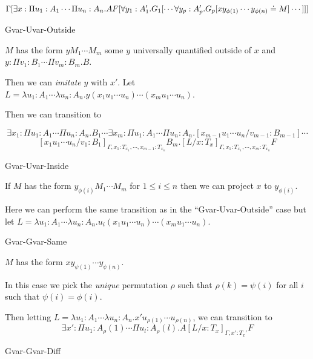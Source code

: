 \[
\Gamma[
\exists x : \Pi u_1 : A_1 \cdots \Pi u_n : A_n . A 
\\
F[\forall y_1 : A'_1 . G_1 
[ \cdots \forall y_p : A'_p . G_p 
[ x y_{\phi(1)} \cdots y_{\phi(n)} \doteq M ]
\cdots
]]]
\]

\begin{tcase}
Gvar-Uvar-Outside
\end{tcase}

$M$ has the form 
$y M_1 \cdots M_m$ some $y$ universally
quantified outside of $x$
and 
$y : \Pi v_1 : B_1 \cdots \Pi v_m : B_m . B$.  

Then we can \textit{imitate} $y$ with $x'$.
Let 
$L = \lambda u_1 : A_1 \cdots \lambda u_n : A_n .
 y (x_1 u_1 \cdots u_n) \cdots (x_m u_1 \cdots u_n)$.

Then we can transition to 

\[
\exists x_1 : \Pi u_1 : A_1 \cdots \Pi u_n : A_n . B_1 \cdots 
\exists x_m : \Pi u_1 : A_1 \cdots \Pi u_n : A_n . 
[x_{m-1}u_1\cdots u_n / v_{m-1} : B_{m-1}]
\cdots 
\]
\[
[x_1 u_1 \cdots u_n / v_1 : B_1]_{\Gamma, x_1:T_{x_1},\cdots, x_{m-1}:T_{x_n}} B_m .
[L / x : T_x ]_{\Gamma, x_1:T_{x_1},\cdots, x_m:T_{x_n}}F
\]

\begin{tcase}
Gvar-Uvar-Inside
\end{tcase}

If $M$ has the form 
$y_{\phi(i)} M_1 \cdots M_m$ for 
$1 \leq i \leq n$ then we can project $x$ to $y_{\phi(i)}$.

Here we can perform the same transition as in the ``Gvar-Uvar-Outside''
case but let 
$L = \lambda u_1 : A_1 \cdots \lambda u_n : A_n .
 u_i (x_1 u_1 \cdots u_n) \cdots (x_m u_1 \cdots u_n)$.

\begin{tcase}
Gvar-Gvar-Same
\end{tcase}

$M$ has the form 
$x y_{\psi(1)} \cdots y_{\psi(n)}$.

In this case we pick the \textit{unique} permutation $\rho$ 
such that $\rho(k) = \psi(i)$ for all $i$ such that $\psi(i) = \phi(i)$.

Then letting
$L = \lambda u_1 : A_1 \cdots \lambda u_n : A_n .
 x' u_{\rho(1)} \cdots u_{\rho(n)} $, 
we can transition to
\[
\exists x' : \Pi u_1 : A_\rho(1) \cdots \Pi u_l : A_\rho(l) . A 
[L / x : T_x ]_{\Gamma, x' : T_x'} F
\] 


\begin{tcase}
Gvar-Gvar-Diff
\end{tcase}


